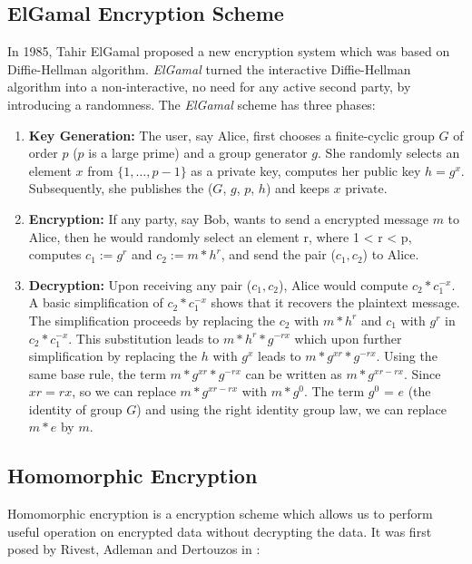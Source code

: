      \subsection{ElGamal Encryption Scheme}
     \label{sec:elgamal}
     In 1985, Tahir ElGamal \citep{elgamal1985public} proposed a new encryption system which was based on Diffie-Hellman algorithm. 
     \textit{ElGamal} turned the interactive  Diffie-Hellman algorithm into a non-interactive, no need for any active second party, by introducing 
     a randomness.  The \textit{ElGamal} scheme has three phases:
     \begin{enumerate}
		\item \textbf{Key Generation:}   
		The user, say Alice, first chooses a finite-cyclic group $G$ of order $p$ ($p$ is a large prime) and a group generator $g$.
		She randomly selects an element $x$ from $\{1, \ldots, p-1\}$ as a private key, computes her public key $h = g^{x}$. 
		Subsequently, she publishes 
		the ($G$, $g$, $p$, $h$) and keeps $x$ private. 
		\item \textbf{Encryption:}
		If any party, say Bob, wants to send a encrypted message $m$ to Alice, then he would randomly select an element 
		r, where 1 < r < p, computes $c_{1} := g^{r}$ and $c_{2} := m * h^{r}$, and send the pair ($c_{1}, c_{2}$) to 
		Alice. 
		\item \textbf{Decryption:}
		Upon receiving any pair ($c_{1}, c_{2}$), Alice would compute $c_{2} * c_{1}^{-x}$. A basic simplification of $c_{2} * c_{1}^{-x}$
		shows that it recovers the plaintext message. The simplification proceeds by replacing the $c_{2}$ with 
		$m*h^{r}$ and $c_{1}$ with $g^{r}$ in $c_{2} * c_{1}^{-x}$. This substitution leads to 
		$m * h ^ {r} * g^{-rx}$ which upon further simplification by replacing the $h$ with $g^{x}$
		leads to $m * g^{xr} * g^{-rx}$. Using the same base rule, the term $m * g^{xr} * g^{-rx}$ can be 
		written as $m * g^{xr - rx}$. Since $x  r = r x$, so we 
		can replace $m * g^{xr - rx}$ with $m * g^{0}$. The term $g^{0}$  = $e$ (the identity of group $G$) and using 
		the right identity group law, we can replace $m * e$ by $m$. 
		
	\end{enumerate}	
    
    \subsection{Homomorphic Encryption}
    \label{sec:homomorphic-enc}
	 Homomorphic encryption  is a encryption scheme which allows us to perform useful operation on 
	     encrypted data without decrypting the data.
	     It was first posed by Rivest, Adleman and Dertouzos in \citep{rivest1978data}: 
      
